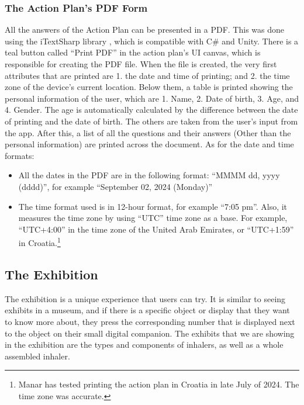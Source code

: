 \subsubsection*{The Action Plan’s PDF Form}
\label{ActionPlanPDF}
All the answers of the Action Plan can be presented in a PDF. This was done using the iTextSharp library \cite{iTextSharp}, which is compatible with C\# and Unity. There is a teal button called “Print PDF” in the action plan’s \acrshort{UI} canvas, which is responsible for creating the PDF file. When the file is created, the very first attributes that are printed are 1. the date and time of printing; and 2. the time zone of the device’s current location. Below them, a table is printed showing the personal information of the user, which are 1. Name, 2. Date of birth, 3. Age, and 4. Gender. The age is automatically calculated by the difference between the date of printing and the date of birth. The others are taken from the user’s input from the app. After this, a list of all the questions and their answers (Other than the personal information) are printed across the document. As for the date and time formats:
\begin{itemize}
    \item{All the dates in the PDF are in the following format: “MMMM dd, yyyy (dddd)”, for example “September 02, 2024 (Monday)”}
    
    \item{The time format used is in 12-hour format, for example “7:05 pm”. Also, it measures the time zone by using “UTC” time zone as a base. For example, “UTC+4:00” in the time zone of the United Arab Emirates, or “UTC+1:59” in Croatia.\footnote{Manar has tested printing the action plan in Croatia in late July of 2024. The time zone was accurate.}}
\end{itemize}

\subsection{The Exhibition}

The exhibition is a unique experience that users can try. It is similar to seeing exhibits in a museum, and if there is a specific object or display that they want to know more about, they press the corresponding number that is displayed next to the object on their small digital companion. The exhibits that we are showing in the exhibition are the types and components of inhalers, as well as a whole assembled inhaler.

